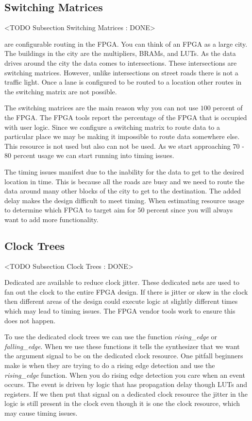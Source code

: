 \subsection{Switching Matrices}
	<TODO Subsection Switching Matrices : DONE>

 are configurable routing	in the \ac{FPGA}. You can think of an \ac{FPGA} as a large city. The buildings in the city are the multipliers, \ac{BRAM}s, and \ac{LUT}s. As the data drives around the city the data comes to intersections. These intersections are switching matrices. However, unlike intersections on street roads there is not a traffic light. Once a lane is configured to be routed to a location other routes in the switching matrix are not possible.

The switching matrices are the main reason why you can not use $100$ percent of the \ac{FPGA}. The \ac{FPGA} tools report the percentage of the \ac{FPGA} that is occupied with user logic. Since we configure a switching matrix to route data to a particular place we may be making it impossible to route data somewhere else. This resource is not used but also can not be used. As we start approaching $70$ - $80$ percent usage we can start running into timing issues.

The timing issues manifest due to the inability for the data to get to the desired location in time. This is because all the roads are busy and we need to route the data around many other blocks of the city to get to the destination. The added delay makes the design difficult to meet timing. When estimating resource usage to determine which \ac{FPGA} to target aim for $50$ percent since you will always want to add more functionality.
	
\subsection{Clock Trees}
	<TODO Subsection Clock Trees : DONE>

Dedicated  are available to reduce clock jitter. These dedicated nets are used to fan out the clock to the entire \ac{FPGA} design. If there is jitter or skew in the clock then different areas of the design could execute logic at slightly different times which may lead to timing issues. The \ac{FPGA} vendor tools work to ensure this does not happen.

To use the dedicated clock trees we can use the function \emph{rising\_edge} or \emph{falling\_edge}. When we use these functions it tells the synthesizer that we want the argument signal to be on the dedicated clock resource. One pitfall beginners make is when they are trying to do a rising edge detection and use the \emph{rising\_edge} function. When you do rising edge detection you care when an event occurs. The event is driven by logic that has propagation delay though \ac{LUT}s and registers. If we then put that signal on a dedicated clock resource the jitter in the logic is still present in the clock even though it is one the clock resource, which may cause timing issues. 

